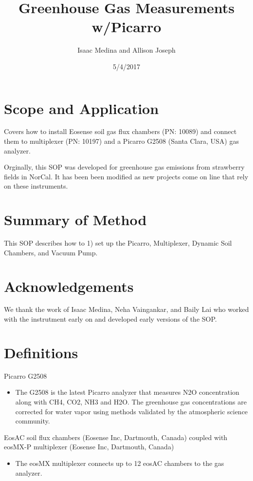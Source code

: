 \documentclass[12pt]{../SOP3}\usepackage[]{graphicx}\usepackage[]{color}
\title{Greenhouse Gas Measurements w/Picarro}
\date{5/4/2017}
\author{Isaac Medina and Allison Joseph}
\begin{document}
\maketitle

\section{Scope and Application}

\NP Covers how to install Eosense soil gas flux chambers (PN: 10089) and connect them to multiplexer (PN: 10197) and a Picarro G2508 (Santa Clara, USA) gas analyzer.

\NP Orginally, this SOP was developed for greenhouse gas emissions from strawberry fields in NorCal. It has been been modified as new projects come on line that rely on these instruments. 

\section{Summary of Method}

\NP This SOP describes how to 1) set up the Picarro, Multiplexer, Dynamic Soil Chambers, and Vacuum Pump. 

\tableofcontents

\newpage

\section{Acknowledgements}

We thank the work of Isaac Medina, Neha Vaingankar, and Baily Lai who worked with the instrutment early on and developed early versions of the SOP. 

\section{Definitions}

\NP Picarro G2508
 \begin{itemize}
 \item The G2508 is the latest Picarro analyzer that measures N2O concentration along with CH4, CO2, NH3 and H2O. The greenhouse gas concentrations are corrected for water vapor using methods validated by the atmospheric science community. 
  \end{itemize}
  
\NP EosAC soil flux chambers (Eosense Inc, Dartmouth, Canada) coupled with
\NP eosMX-P multiplexer (Eosense Inc, Dartmouth, Canada)
  \begin{itemize}
  \item The eosMX multiplexer connects up to 12 eosAC chambers to the gas analyzer. 
  \end{itemize}
  
\end{document}

